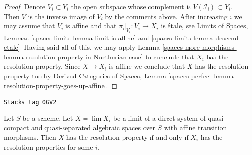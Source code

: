 \begin{proof}
Denote $V_i \subset Y_i$ the open subspace whose complement
is $V(\mathcal{I}_i) \subset Y_i$. Then $V$ is the inverse image
of $V_i$ by the comments above. After increasing $i$ we may assume
that $V_i$ is affine and that $\pi_i|_{V_i} : V_i \to X_i$ is
\'etale, see
Limits of Spaces, Lemmas
\ref{spaces-limits-lemma-limit-is-affine} and
\ref{spaces-limits-lemma-descend-etale}.
Having said all of this, we may apply
Lemma \ref{spaces-more-morphisms-lemma-resolution-property-in-Noetherian-case}
to conclude that $X_i$ has the
resolution property. Since $X \to X_i$ is affine
we conclude that $X$ has the resolution property too
by Derived Categories of Spaces, Lemma
\ref{spaces-perfect-lemma-resolution-property-goes-up-affine}.
\end{proof}

\begin{lemma}
\label{spaces-more-morphisms-lemma-resolution-property-descends}
\href{https://stacks.math.columbia.edu/tag/0GV2}{\texttt{Stacks tag 0GV2}}

Let $S$ be a scheme.
Let $X = \lim X_i$ be a limit of a direct system of quasi-compact
and quasi-separated algebraic spaces over $S$ with affine transition morphisms.
Then $X$ has the resolution property if and only if $X_i$ has
the resolution properties for some $i$.
\end{lemma}


